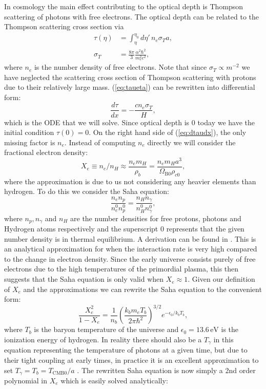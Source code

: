 \documentclass[%
reprint,
 amsmath,amssymb,
 aps,
]{revtex4-2}
\begin{document}
In cosmology the main effect contributing to the optical depth is Thompson scattering of photons with free electrons. The optical depth can be related to the Thompson scattering cross section via
\begin{align}
	\tau(\eta)&=\int_\eta^{\eta_0}d\eta'\,n_e\sigma_Ta,
	\label{eq:taueta}\\
	\sigma_T&=\frac{8\pi}{3}\frac{\alpha^2\hbar^2}{m_e^2c^2},\nonumber
\end{align}
where $n_e$ is the number density of free electrons. Note that since $\sigma_T\propto m^{-2}$ we have neglected the scattering cross section of Thompson scattering with protons due to their relatively large mass. (\ref{eq:taueta}) can be rewritten into differential form:
\begin{equation}
	\frac{d\tau}{dx}=-\frac{cn_e\sigma_T}{H}, \label{eq:dtaudx}
\end{equation}
which is the ODE that we will solve. Since optical depth is $0$ today we have the initial condition $\tau(0)=0$. On the right hand side of (\ref{eq:dtaudx}), the only missing factor is $n_e$. Instead of computing $n_e$ directly we will consider the fractional electron density:
\[X_e\equiv n_e/n_H\approx\frac{n_em_H}{\rho_b}=\frac{n_em_Ha^3}{\Omega_{\text{B}0}\rho_{c0}},\]
where the approximation is due to us not considering any heavier elements than hydrogen. To do this we consider the Saha equation:
\[\frac{n_en_p}{n_e^{0}n_p^{0}}=\frac{n_Hn_\gamma}{n_H^{0}n_\gamma^{0}},\]
where $n_p,n_\gamma$ and $n_H$ are the number densities for free protons, photons and Hydrogen atoms respectively and the superscript $0$ represents that the given number density is in thermal equilibrium. A derivation can be found in \cite{Dodelson:2003ft}. This is an analytical approximation for when the interaction rate is very high compared to the change in electron density. Since the early universe consists purely of free electrons due to the high temperatures of the primordial plasma, this then suggests that the Saha equation is only valid when $X_e\approx 1$. Given our definition of $X_e$ and the approximations we can rewrite the Saha equation to the convenient form:
\begin{equation}
	\frac{X_e^2}{1-X_e}=\frac{1}{n_b}\left(\frac{k_bm_eT_b}{2\pi\hbar^2}\right)^{3/2}e^{-\epsilon_0/k_bT_b},
\end{equation}
where $T_b$ is the baryon temperature of the universe and $\epsilon_0=13.6\,\text{eV}$ is the ionization energy of hydrogen. In reality there should also be a $T_\gamma$ in this equation representing the temperature of photons at a given time, but due to their tight coupling at early times, in practice it is an excellent approximation to set $T_\gamma=T_b=T_{\text{CMB}0}/a$ \cite{AST5220LectureNotes}. The rewritten Saha equation is now simply a 2nd order polynomial in $X_e$ which is easily solved analytically:
\end{document}
